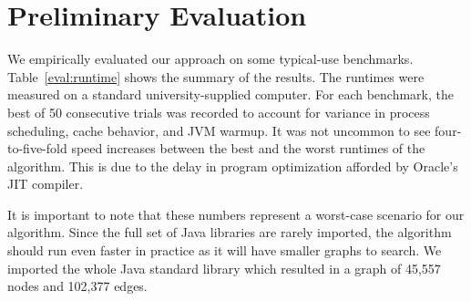 \section{Preliminary Evaluation}
\label{sec:evaluation}

We empirically evaluated our approach on some typical-use benchmarks. Table~\ref{eval:runtime} shows the summary of the results. The runtimes were measured on a standard university-supplied computer. For each benchmark, the best of 50 consecutive trials was recorded to account for variance in process scheduling, cache behavior, and JVM warmup. It was not uncommon to see four-to-five-fold speed increases between the best and the worst runtimes of the algorithm. This is due to the delay in program optimization afforded by Oracle's JIT compiler.

It is important to note that these numbers represent a worst-case scenario for our algorithm. Since the full set of Java libraries are rarely imported, the algorithm should run even faster in practice as it will have smaller graphs to search. We imported the whole Java standard library which resulted in a graph of 45,557 nodes and 102,377 edges.
